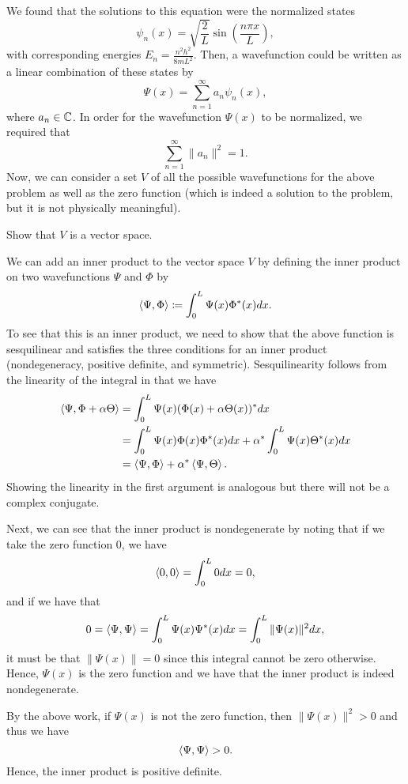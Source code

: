 We found that the solutions to this equation were the normalized states 
\[
\psi_n(x) = \sqrt{\frac{2}{L}} \sin\left(\frac{n\pi x}{L}\right),
\]
with corresponding energies $E_n = \frac{n^2h^2}{8mL^2}$. Then, a wavefunction could be written as a linear combination of these states by
\[
\Psi(x) = \sum_{n=1}^\infty a_n \psi_n(x),
\]
where $a_n \in \mathbb{C}$.  In order for the wavefunction $\Psi(x)$ to be normalized, we required that
\[
\sum_{n=1}^\infty \|a_n\|^2=1.
\]
Now, we can consider a set $V$ of all the possible wavefunctions for the above problem as well as the zero function (which is indeed a solution to the problem, but it is not physically meaningful).

\begin{exercise}
	Show that $V$ is a vector space. 
\end{exercise}

We can add an inner product to the vector space $V$ by defining the inner product on two wavefunctions $\Psi$ and $\Phi$ by
\[
\left\langle \Psi, \Phi \right\rangle \coloneqq \int_0^L \Psi(x) \Phi^*(x)dx.
\]
To see that this is an inner product, we need to show that the above function is sesquilinear and satisfies the three conditions for an inner product (nondegeneracy, positive definite, and symmetric).  Sesquilinearity follows from the linearity of the integral in that we have
\begin{align*}
	\left\langle \Psi, \Phi+\alpha \Theta \right\rangle &= \int_0^L \Psi(x)(\Phi(x)+\alpha \Theta(x))^*dx \\
	&= \int_0^L \Psi(x) \Phi(x)\Phi^*(x)dx+\alpha^* \int_0^L \Psi(x) \Theta^*(x)dx\\
	&= \left\langle \Psi, \Phi \right\rangle+\alpha^* \left\langle \Psi, \Theta \right\rangle.
\end{align*}
Showing the linearity in the first argument is analogous but there will not be a complex conjugate.  

Next, we can see that the inner product is nondegenerate by noting that if we take the zero function 0, we have
\[
\left\langle 0, 0 \right\rangle = \int_0^L 0 dx = 0,
\]
and if we have that
\[
0=\left\langle \Psi, \Psi \right\rangle  = \int_0^L \Psi(x)\Psi^*(x)dx = \int_0^L \|\Psi(x)\|^2dx,
\]
it must be that $\|\Psi(x)\|=0$ since this integral cannot be zero otherwise.  Hence, $\Psi(x)$ is the zero function and we have that the inner product is indeed nondegenerate.

By the above work, if $\Psi(x)$ is not the zero function, then $\|\Psi(x)\|^2>0$ and thus we have
\[
\left\langle \Psi, \Psi \right\rangle>0.
\]
Hence, the inner product is positive definite.


